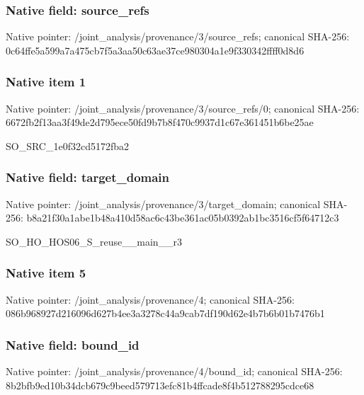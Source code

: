 \documentclass[10pt,a4paper]{article}
\begin{document}
\subsubsection{Native field: source\_\allowbreak{}refs}
Native pointer: /joint\_\allowbreak{}analysis/provenance/3/source\_\allowbreak{}refs; canonical SHA-256: 0c64ffe5a599a7a475cb7f5a3aa50c63ae37ce980304a1e9f330342ffff0d8d6

\subsubsection{Native item 1}
Native pointer: /joint\_\allowbreak{}analysis/provenance/3/source\_\allowbreak{}refs/0; canonical SHA-256: 6672fb2f13aa3f49de2d795ece50fd9b7b8f470c9937d1c67e361451b6be25ae

\begingroup\raggedright\sloppy SO\_\allowbreak{}SRC\_\allowbreak{}1e0f32cd5172fba2\par\endgroup

\subsubsection{Native field: target\_\allowbreak{}domain}
Native pointer: /joint\_\allowbreak{}analysis/provenance/3/target\_\allowbreak{}domain; canonical SHA-256: b8a21f30a1abe1b48a410d58ac6c43be361ac05b0392ab1bc3516cf5f64712c3

\begingroup\raggedright\sloppy SO\_\allowbreak{}HO\_\allowbreak{}HOS06\_\allowbreak{}S\_\allowbreak{}reuse\_\allowbreak{}\_\allowbreak{}main\_\allowbreak{}\_\allowbreak{}r3\par\endgroup

\subsubsection{Native item 5}
Native pointer: /joint\_\allowbreak{}analysis/provenance/4; canonical SHA-256: 086b968927d216096d627b4ee3a3278c44a9cab7df190d62e4b7b6b01b7476b1

\subsubsection{Native field: bound\_\allowbreak{}id}
Native pointer: /joint\_\allowbreak{}analysis/provenance/4/bound\_\allowbreak{}id; canonical SHA-256: 8b2bfb9ed10b34dcb679c9beed579713efc81b4ffcade8f4b512788295cdce68
\end{document}
